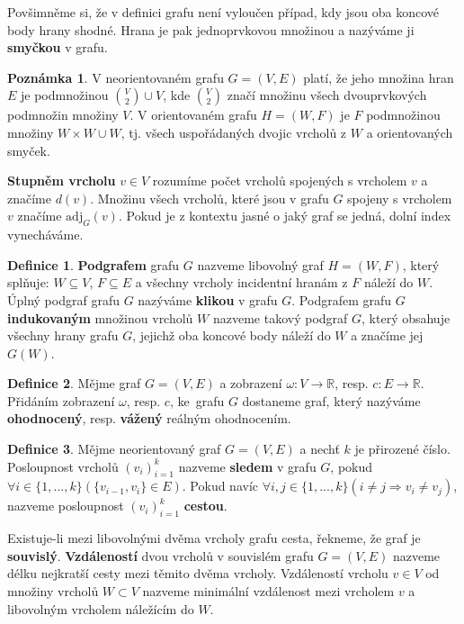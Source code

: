 \documentclass{ctuthesis}
\theoremstyle{plain}
\theoremstyle{definition}
\newtheorem{definition}{Definice}
\newtheorem{remark}{Poznámka}
\begin{document}
Povšimněme si, že v definici grafu není vyloučen případ, kdy jsou oba koncové body hrany shodné. Hrana je pak jednoprvkovou množinou a nazýváme ji \textbf{smyčkou} v grafu.

\begin{remark}
  V neorientovaném grafu $G=(V,E)$ platí, že jeho množina hran $E$ je podmnožinou ${V \choose 2} \cup V$, kde $V \choose 2$ značí množinu všech dvouprvkových podmnožin množiny $V$. V orientovaném grafu $H=(W,F)$ je $F$ podmnožinou množiny $W \times W \cup W$, tj. všech uspořádaných dvojic vrcholů z $W$ a orientovaných smyček.
\end{remark}

\textbf{Stupněm vrcholu} $v \in V$ rozumíme počet vrcholů spojených s vrcholem $v$ a značíme $d(v)$. Množinu všech vrcholů, které jsou v grafu $G$ spojeny s vrcholem $v$ značíme $\mathrm{adj}_G(v)$. Pokud je z kontextu jasné o jaký graf se jedná, dolní index vynecháváme.

\begin{definition}
  \textbf{Podgrafem} grafu $G$ nazveme libovolný graf $H=(W,F)$, který splňuje: $W\subseteq V$, $F\subseteq E$ a všechny vrcholy incidentní hranám z $F$ náleží do $W$. Úplný podgraf grafu $G$ nazýváme \textbf{klikou} v grafu $G$. Podgrafem grafu $G$ \textbf{indukovaným} množinou vrcholů $W$ nazveme takový podgraf $G$, který obsahuje všechny hrany grafu $G$, jejichž oba koncové body náleží do $W$ a značíme jej $G(W)$.
\end{definition}

\begin{definition}
  Mějme graf $G=(V,E)$ a zobrazení $\omega:V \rightarrow \mathbb{R}$, resp. $c: E \rightarrow \mathbb{R}$. Přidáním zobrazení $\omega$, resp. $c$, ke~grafu $G$ dostaneme graf, který nazýváme \textbf{ohodnocený}, resp. \textbf{vážený} reálným ohodnocením.
\end{definition}

\begin{definition}
  Mějme neorientovaný graf $G=(V,E)$ a nechť $k$ je přirozené číslo. Posloupnost vrcholů $(v_i)_{i=1}^{k}$ nazveme \textbf{sledem} v grafu $G$, pokud $\forall i \in \{1,...,k\} (\{v_{i-1},v_i\} \in E)$. Pokud navíc  $\forall i,j \in \{1,...,k\} (i \neq j \Rightarrow v_i \neq v_j)$, nazveme posloupnost $(v_i)_{i=1}^{k}$ \textbf{cestou}.
\end{definition}

Existuje-li mezi libovolnými dvěma vrcholy grafu cesta, řekneme, že graf je \textbf{souvislý}.
\textbf{Vzdáleností} dvou vrcholů v souvislém grafu $G=(V,E)$ nazveme délku nejkratší cesty mezi těmito dvěma vrcholy. Vzdáleností vrcholu $v \in V$ od množiny vrcholů $W \subset V$ nazveme minimální vzdálenost mezi vrcholem $v$ a libovolným vrcholem náležícím do $W$. 
\end{document}
